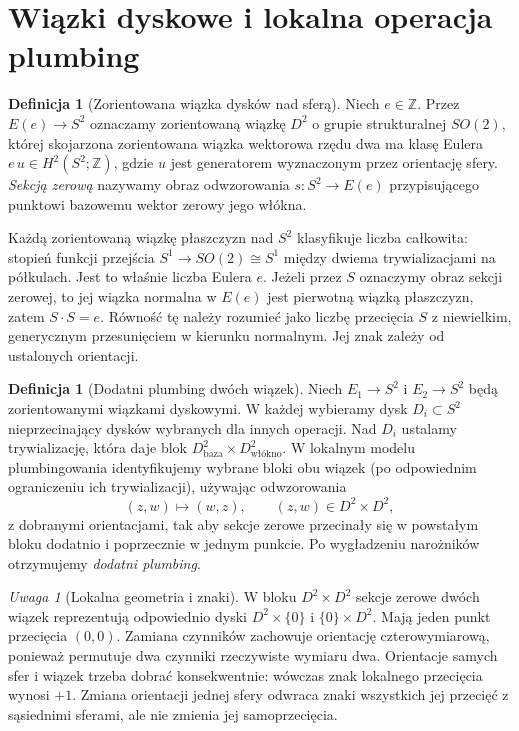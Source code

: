 \documentclass[11pt,a4paper]{report}
\numberwithin{equation}{section}
\theoremstyle{plain}
\theoremstyle{definition}
\newtheorem{definicja}[twierdzenie]{Definicja}
\theoremstyle{remark}
\newtheorem{uwaga}[twierdzenie]{Uwaga}
\begin{document}
\section{Wiązki dyskowe i lokalna operacja plumbing}
\label{sec:tg-plumbing-definition}

\begin{definicja}[Zorientowana wiązka dysków nad sferą]
Niech $e\in\mathbb Z$. Przez $E(e)\to S^2$ oznaczamy zorientowaną
wiązkę $D^2$ o grupie strukturalnej $SO(2)$, której skojarzona
zorientowana wiązka wektorowa rzędu dwa ma klasę Eulera
$e\,u\in H^2(S^2;\mathbb Z)$, gdzie $u$ jest generatorem
wyznaczonym przez orientację sfery. \emph{Sekcją zerową}
nazywamy obraz odwzorowania $s\colon S^2\to E(e)$ przypisującego
punktowi bazowemu wektor zerowy jego włókna.
\end{definicja}

Każdą zorientowaną wiązkę płaszczyzn nad $S^2$ klasyfikuje
liczba całkowita: stopień funkcji przejścia
$S^1\to SO(2)\cong S^1$ między dwiema trywializacjami
na półkulach. Jest to właśnie liczba Eulera $e$.
Jeżeli przez $S$ oznaczymy obraz sekcji zerowej,
to jej wiązka normalna w $E(e)$ jest pierwotną wiązką
płaszczyzn, zatem $S\cdot S=e$. Równość tę należy
rozumieć jako liczbę przecięcia $S$ z niewielkim,
generycznym przesunięciem w kierunku normalnym.
Jej znak zależy od ustalonych orientacji.

\begin{definicja}[Dodatni plumbing dwóch wiązek]
Niech $E_1\to S^2$ i $E_2\to S^2$ będą zorientowanymi
wiązkami dyskowymi. W każdej wybieramy dysk $D_i\subset S^2$
nieprzecinający dysków wybranych dla innych operacji.
Nad $D_i$ ustalamy trywializację, która daje blok
$D^2_{\text{baza}}\times D^2_{\text{włókno}}$.
W lokalnym modelu plumbingowania identyfikujemy wybrane
bloki obu wiązek (po odpowiednim ograniczeniu ich
trywializacji), używając odwzorowania
\[
(z,w)\longmapsto(w,z), \qquad (z,w)\in D^2\times D^2,
\]
z dobranymi orientacjami, tak aby sekcje zerowe przecinały się
w powstałym bloku dodatnio i poprzecznie w jednym punkcie.
Po wygładzeniu narożników otrzymujemy \emph{dodatni plumbing}.
\end{definicja}

\begin{uwaga}[Lokalna geometria i znaki]
W bloku $D^2\times D^2$ sekcje zerowe dwóch wiązek
reprezentują odpowiednio dyski $D^2\times\{0\}$ i
$\{0\}\times D^2$. Mają jeden punkt przecięcia $(0,0)$.
Zamiana czynników zachowuje orientację czterowymiarową,
ponieważ permutuje dwa czynniki rzeczywiste wymiaru dwa.
Orientacje samych sfer i wiązek trzeba dobrać konsekwentnie:
wówczas znak lokalnego przecięcia wynosi $+1$. Zmiana
orientacji jednej sfery odwraca znaki wszystkich jej przecięć
z sąsiednimi sferami, ale nie zmienia jej samoprzecięcia.
\end{uwaga}
\end{document}
